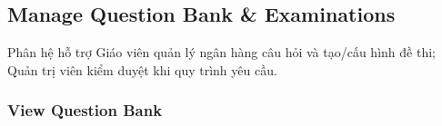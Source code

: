 \documentclass[12pt,a4paper,oneside]{report}
\begin{document}

\subsection{Manage Question Bank \& Examinations}
\label{subsec:manage-question-bank-examinations}

Phân hệ hỗ trợ Giáo viên quản lý ngân hàng câu hỏi và tạo/cấu hình đề thi; Quản trị viên kiểm duyệt khi quy trình yêu cầu.

\subsubsection{View Question Bank}
\label{subsubsec:view-question-bank}
\end{document}
